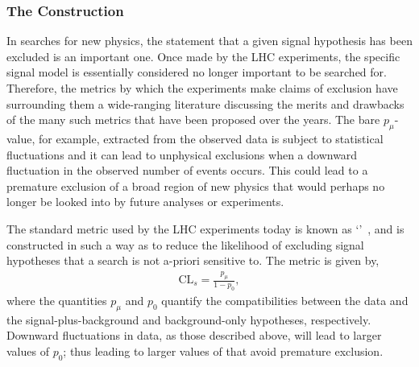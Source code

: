 %
%

\subsubsection{The \cls Construction}
\label{sec:cls_method}

In searches for new physics, the statement that a given signal hypothesis has been excluded
is an important one.
Once made by the LHC experiments, the specific signal model is essentially considered
no longer important to be searched for.
Therefore, the metrics by which the experiments make claims of exclusion have surrounding them
a wide-ranging literature discussing the merits and drawbacks of the many such metrics
that have been proposed over the years.
The bare $p_{\mu}$-value, for example, extracted from the observed data is subject to statistical fluctuations
and it can lead to unphysical exclusions when a downward fluctuation in the observed
number of events occurs.
This could lead to a premature exclusion of a broad region of new physics
that would perhaps no longer be looked into by future analyses or experiments.

The standard metric used by the LHC experiments today is known as `\cls'~\cite{CLSReadI,CLSReadII},
and is constructed in such a way as to reduce the likelihood of excluding signal
hypotheses that a search is not a-priori sensitive to.
The \cls metric is given by,
\begin{align}
    \text{CL}_s = \frac{p_{\mu}}{1-p_0},
    \label{eq:cls_def}
\end{align}
where the quantities $p_{\mu}$ and $p_0$ quantify the compatibilities between the data and the signal-plus-background
and background-only hypotheses, respectively.
Downward fluctuations in data, as those described above, will lead to larger values of $p_0$; thus
leading to larger values of \cls that avoid premature exclusion.

